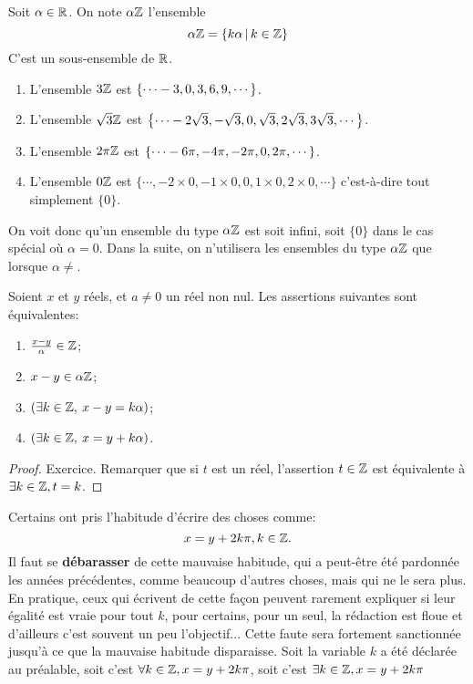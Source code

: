 \begin{definition}
Soit $\alpha\in\mathbb{R}$. On note $\alpha\mathbb{Z}$ l'ensemble
\[ \alpha\Z=\ensemble{k\alpha}{k\in\Z}\]
C'est un sous-ensemble de $\mathbb{R}$.
\end{definition}

\begin{exemples}
\begin{enumerate}
\item L'ensemble $3\mathbb{Z}$ est $\left\{\cdots -3, 0, 3, 6, 9, \cdots\right\}$.
\item L'ensemble $\sqrt3\mathbb{Z}$ est $\left\{\cdots -2\sqrt 3, -\sqrt 3, 0, \sqrt 3, 2\sqrt 3, 3\sqrt 3,\cdots\right\}$.
\item L'ensemble $2\pi\mathbb{Z}$ est $\left\{\cdots -6\pi, -4\pi, -2\pi, 0, 2\pi, \cdots\right\}$.
\item L'ensemble $0\mathbb{Z}$ est $\{\cdots, -2\times0, -1\times 0, 0, 1\times 0, 2\times 0, \cdots\}$ c'est-à-dire tout simplement $\{0\}$.
\end{enumerate}
\end{exemples}

On voit donc qu'un ensemble du type $\alpha\mathbb{Z}$ est soit infini, soit $\{0\}$ dans le cas spécial où $\alpha=0$. Dans la suite, on n'utilisera les ensembles du type $\alpha\mathbb{Z}$ que lorsque $\alpha\neq$. \\





\begin{proposition}
Soient $x$ et $y$ réels, et $a\neq 0$ un réel non nul. Les assertions suivantes sont équivalentes:
\begin{enumerate}
\item $\frac{x-y}{\alpha} \in \mathbb{Z}$;
\item $x-y \in \alpha\mathbb{Z}$;
\item $(\exists k\in\mathbb{Z},\: x-y=k\alpha)$;
\item $(\exists k\in\mathbb{Z},\: x= y + k\alpha)$.
\end{enumerate}
\end{proposition}
\begin{proof}
Exercice. Remarquer que si $t$ est un réel, l'assertion \og $t\in\mathbb{Z}$\fg{} est équivalente à \og$\exists k\in\mathbb{Z}, t=k$\fg.
\end{proof}


\begin{attention}
Certains ont pris l'habitude d'écrire des choses comme:
\[ x=y+2k\pi, k\in\mathbb{Z}.\]
Il faut se \textbf{débarasser} de cette mauvaise habitude, qui a peut-être été pardonnée les années précédentes, comme beaucoup d'autres choses, mais qui ne le sera plus. En pratique, ceux qui écrivent de cette façon peuvent rarement expliquer si leur égalité est vraie pour tout $k$, pour certains, pour un seul, la rédaction est floue et d'ailleurs c'est souvent un peu l'objectif... Cette faute sera fortement sanctionnée jusqu'à ce que la mauvaise habitude disparaisse. Soit la variable $k$ a été déclarée au préalable, soit c'est $\forall k\in\mathbb{Z}, x=y+2k\pi$, soit c'est $\exists k\in\mathbb{Z}, x=y+2k\pi$
\end{attention}

